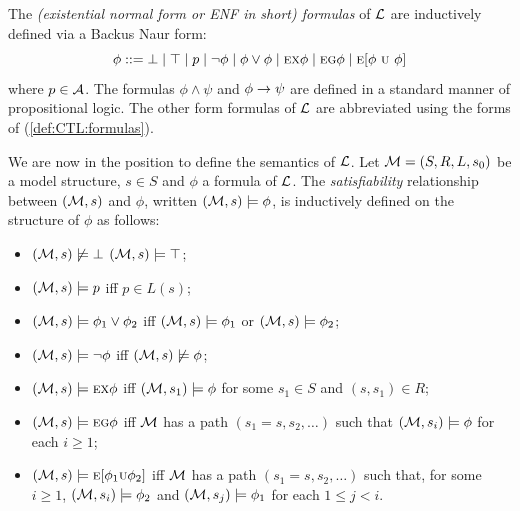 \documentclass{article}
\begin{document}
The {\em (existential normal form or ENF in short) formulas} of
$\cal L$ are inductively defined via a Backus Naur form:
\begin{equation}\label{def:CTL:formulas}
  \phi ::=  \bot \mid \top \mid p \mid\neg\phi \mid \phi\lor\phi \mid
    \EXIST \NEXT \phi \mid
    \EXIST \GLOBAL \phi \mid
    \EXIST [\phi\ \UNTIL\ \phi]%
\end{equation}
where $p\in\cal A$. The formulas $\phi\land\psi$ and $\phi\rightarrow\psi$
are defined in a standard manner of propositional logic.
The other form formulas of $\cal L$ are abbreviated
using the forms of (\ref{def:CTL:formulas}).

We are now in the position to define the semantics of $\cal L$.
Let ${\cal M}=(S,R,L,s_0)$ be a model structure, $s\in S$ and $\phi$ a formula of $\cal L$.
The {\em satisfiability} relationship between $({\cal M},s)$ and $\phi$,
written $({\cal M},s)\models\phi$, is inductively defined on the structure of $\phi$ as follows:

\begin{itemize}
  \item $({\cal M},s)\not\models\bot$   $({\cal M},s)\models\top$;
  \item $({\cal M},s)\models p$ iff $p\in L(s)$;
  \item $({\cal M},s)\models \phi_1\lor\phi_2$ iff
    $({\cal M},s)\models \phi_1$ or $({\cal M},s)\models \phi_2$;
  \item $({\cal M},s)\models \neg\phi$ iff  $({\cal M},s)\not\models\phi$;
  \item $({\cal M},s)\models \textsc{e}\textsc{x}\phi$ iff
    $({\cal M},s_1)\models\phi$ for some $s_1\in S$ and $(s,s_1)\in R$;
  \item $({\cal M},s)\models \textsc{e}\textsc{g}\phi$ iff
    $\cal M$ has a path $(s_1=s,s_2,\ldots)$ such that
    $({\cal M},s_i)\models\phi$ for each $i\ge 1$;
  \item $({\cal M},s)\models \textsc{e}[\phi_1\textsc{u}\phi_2]$ iff
    $\cal M$ has a path $(s_1=s,s_2,\ldots)$ such that, for some $i\ge 1$,
    $({\cal M},s_i)\models\phi_2$ and
    $({\cal M},s_j)\models\phi_1$ for each $1\leq j<i$.
\end{itemize}
\end{document}
